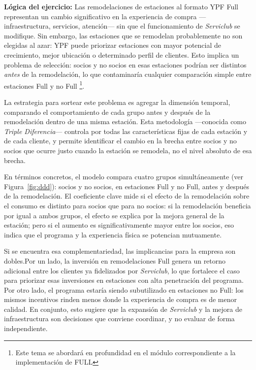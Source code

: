 \textbf{Lógica del ejercicio:} Las remodelaciones de estaciones al formato YPF Full 
representan un cambio significativo en la experiencia de compra ---infraestructura, 
servicios, atención--- sin que el funcionamiento de \emph{Serviclub} se modifique. 
Sin embargo, las estaciones que se remodelan probablemente no son elegidas al azar: 
YPF puede priorizar estaciones con mayor potencial de crecimiento, mejor ubicación o 
determinado perfil de clientes. Esto implica un problema de selección: socios y no 
socios en esas estaciones podrían ser distintos \emph{antes} de la remodelación, lo 
que contaminaría cualquier comparación simple entre estaciones Full y no Full \footnote{Este tema se abordará en profundidad en el módulo correspondiente a la implementación de FULL}.

La estrategia para sortear este problema es agregar la dimensión temporal, comparando 
el comportamiento de cada grupo antes y después de la remodelación dentro de una misma 
estación. Esta metodología ---conocida como \emph{Triple Diferencia}--- controla por 
todas las características fijas de cada estación y de cada cliente, y permite 
identificar el cambio en la brecha entre socios y no socios que ocurre justo cuando 
la estación se remodela, no el nivel absoluto de esa brecha.

En términos concretos, el modelo compara cuatro grupos simultáneamente (ver Figura~\ref{fig:ddd}): socios y no socios, en estaciones Full y no Full, antes y después de la remodelación. El coeficiente clave mide si el efecto de la remodelación sobre el consumo es distinto para socios que para no socios: si la remodelación beneficia por igual a ambos grupos, el efecto se explica por la mejora general de la estación; pero si el aumento es significativamente mayor entre los socios, eso indica que el programa y la experiencia física se potencian mutuamente.

Si se encuentra esa complementariedad, las implicancias para la empresa son dobles.Por un lado, la inversión en remodelaciones Full genera un retorno adicional entre los clientes ya fidelizados por \emph{Serviclub}, lo que fortalece el caso para priorizar esas inversiones en estaciones con alta penetración del programa. Por otro lado, el programa estaría siendo subutilizado en estaciones no Full: los mismos incentivos rinden menos donde la experiencia de compra es de menor calidad. En conjunto, esto sugiere que la expansión de \emph{Serviclub} y la mejora de infraestructura son decisiones que conviene coordinar, y no evaluar de forma independiente.

